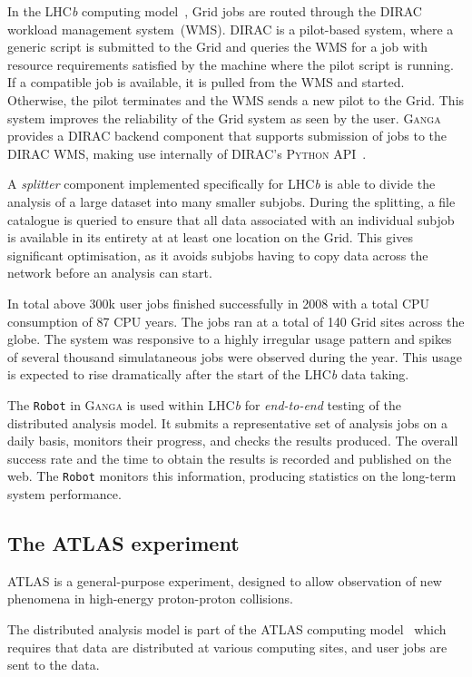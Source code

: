 \documentclass{elsart}
\def\lhcb {LHC{\em b\/}\xspace}
\def\dirac{DIRAC\xspace}
\def\atlas {ATLAS\xspace}
\def\ganga {\textsc{Ganga}\xspace}
\def\python {\textsc{Python}\xspace}
\def\grid {Grid\xspace}
\newcommand{\code}[1]{\texttt{#1}}
\begin{document}
In the \lhcb computing model~\cite{lhcb:2005jj}, \grid jobs are routed
through the
\dirac~\cite{DIRAC} workload management system~(WMS). \dirac is a pilot-based
system, where a generic script is submitted to the \grid and queries the
WMS for a job with resource requirements satisfied by the machine where the
pilot script is running.  If a compatible job is available, it is
pulled from the WMS
and started.  Otherwise, the pilot 
terminates and the WMS sends a new pilot to the \grid. This system 
improves the reliability of the \grid system as seen by the user. \ganga
provides a \dirac backend
component that supports submission of jobs to the \dirac
WMS, making use internally of \dirac's \python API~\cite{DIRACAPI}.

A \emph{splitter} component implemented specifically for \lhcb is able to divide
the
analysis of a large dataset into many smaller subjobs. During the splitting,
a file catalogue is queried to ensure that all data associated with an
individual subjob is
available in its entirety at at least one location on the \grid. This gives
significant optimisation, as it avoids subjobs having to copy data across the
network
before an analysis can start.

In total above 300k user jobs finished successfully in 2008 with a total
CPU consumption of 87 CPU years. The jobs ran at a total of 140 Grid
sites across the globe. The system was responsive to a highly irregular
usage pattern and spikes of several thousand simulataneous jobs were
observed during the year. This usage is expected to rise dramatically after the start of the
\lhcb data taking.

The \code{Robot} in \ganga is used within \lhcb for \emph{end-to-end} testing
of the distributed analysis model. It submits a representative set of
analysis jobs on a daily basis, monitors their progress, and checks 
the results produced. The overall success rate and the time to obtain
the results is recorded and published on the web. The
\code{Robot} monitors this information, producing statistics on the
long-term system performance.

\subsection{The \atlas experiment}
\label{sec:atlas}

\atlas is a general-purpose experiment, designed to allow observation of new
phenomena in high-energy proton-proton collisions.

The distributed analysis model is part of the \atlas computing
model~\cite{bib:atlascompmod} which requires that data are distributed at
various computing sites, and user jobs are sent to the data.
\end{document}

